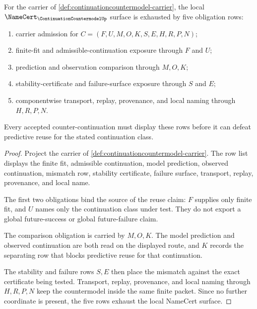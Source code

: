 \begin{theorem}
\label{thm:continuationcountermodel-namecert-obligations}
For the carrier of \autoref{def:continuationcountermodel-carrier}, the local $\NameCert_{\ContinuationCountermodelUp}$ surface is exhausted by five obligation rows:
\begin{enumerate}
\item carrier admission for $C=(F,U,M,O,K,S,E,H,R,P,N)$;
\item finite-fit and admissible-continuation exposure through $F$ and $U$;
\item prediction and observation comparison through $M,O,K$;
\item stability-certificate and failure-surface exposure through $S$ and $E$;
\item componentwise transport, replay, provenance, and local naming through $H,R,P,N$.
\end{enumerate}
Every accepted counter-continuation must display these rows before it can defeat predictive reuse for the stated continuation class.
\end{theorem}
\begin{proof}
Project the carrier of \autoref{def:continuationcountermodel-carrier}. The row list displays the finite fit, admissible continuation, model prediction, observed continuation, mismatch row, stability certificate, failure surface, transport, replay, provenance, and local name.

The first two obligations bind the source of the reuse claim: $F$ supplies only finite fit, and $U$ names only the continuation class under test. They do not export a global future-success or global future-failure claim.

The comparison obligation is carried by $M,O,K$. The model prediction and observed continuation are both read on the displayed route, and $K$ records the separating row that blocks predictive reuse for that continuation.

The stability and failure rows $S,E$ then place the mismatch against the exact certificate being tested. Transport, replay, provenance, and local naming through $H,R,P,N$ keep the countermodel inside the same finite packet. Since no further coordinate is present, the five rows exhaust the local NameCert surface.
\end{proof}

